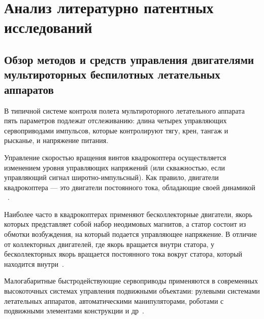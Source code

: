 \section{Анализ литературно патентных исследований}



\subsection{Обзор методов 
  и средств управления  двигателями 
  мультироторных беспилотных летательных аппаратов}

В типичной системе контроля полета
мультироторного летательного аппарата
пять параметров подлежат отслеживанию: длина четырех управляющих
сервоприводами импульсов, которые контролируют тягу, крен, тангаж и
рысканье, и напряжение питания.

Управление скоростью вращения винтов квадрокоптера осуществляется
изменением уровня управляющих напряжений (или скважностью, если
управляющий сигнал широтно-импульсный). Как правило, двигатели
квадрокоптера — это двигатели постоянного тока, обладающие своей
динамикой ~\cite{liisuho}.


Наиболее часто в квадрокоптерах применяют бесколлекторные двигатели,
якорь которых представляет собой набор неодимовых магнитов, а статор
состоит из обмотки возбуждения, на который подается управляющее
напряжение. В отличие от коллекторных двигателей, где якорь вращается
внутри статора, у бесколлекторных якорь вращается постоянного тока
вокруг статора, который находится внутри~\cite{Solodovnikov1976}.

Малогабаритные быстродействующие сервоприводы применяются в
современных высокоточных системах управления подвижными объектами:
рулевыми системами летательных аппаратов, автоматическими
манипуляторами, роботами с подвижными элементами конструкции и
др~\cite{dyakovSUBSTANTIATIONRELIABILITYSERVOMOTORS2023}.

